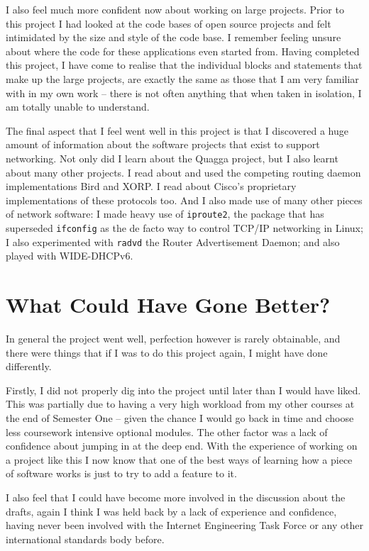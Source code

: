 \documentclass[12pt]{report}
\begin{document}
I also feel much more confident now about working on large projects. Prior to
this project I had looked at the code bases of open source projects and felt
intimidated by the size and style of the code base. I remember feeling unsure
about where the code for these applications even started from. Having completed
this project, I have come to realise that the individual blocks and statements
that make up the large projects, are exactly the same as those that I am very
familiar with in my own work -- there is not often anything that when taken in
isolation, I am totally unable to understand.

The final aspect that I feel went well in this project is that I discovered a
huge amount of information about the software projects that exist to support
networking. Not only did I learn about the Quagga project, but I also learnt
about many other projects. I read about and used the competing routing daemon
implementations Bird and XORP\@. I read about Cisco's proprietary implementations of
these protocols too. And I also made use of many other pieces of network
software: I made heavy use of \texttt{iproute2}, the package that has
superseded \texttt{ifconfig} as the de facto way to control TCP/IP networking
in Linux; I also experimented with \texttt{radvd} the Router Advertisement
Daemon; and also played with WIDE-DHCPv6. 

\section{What Could Have Gone Better?}
In general the project went well, perfection however is rarely obtainable, and
there were things that if I was to do this project again, I might have done
differently. 

Firstly, I did not properly dig into the project until later than I would have
liked.  This was partially due to having a very high workload from my other
courses at the end of Semester One -- given the chance I would go back in time
and choose less coursework intensive optional modules. The other factor was a
lack of confidence about jumping in at the deep end. With the experience of
working on a project like this I now know that one of the best ways of learning
how a piece of software works is just to try to add a feature to it.

I also feel that I could have become more involved in the discussion about the
drafts, again I think I was held back by a lack of experience and confidence,
having never been involved with the Internet Engineering Task Force or any
other international standards body before. 
 
\end{document}
